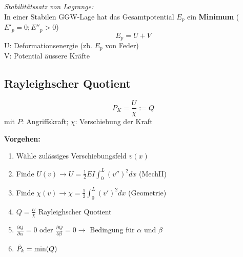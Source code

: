         \textit{Stabilitätssatz von Lagrange:}
        \\In einer Stabilen GGW-Lage hat das Gesamtpotential $E_p$ ein \textbf{Minimum} ($E'_p=0; E''_p>0$)
        \vspace{-2mm}\[E_p = U+V\]
        U: Deformationsenergie (zb. $E_p$ von Feder) 
        \\V: Potential äussere Kräfte
    \subsection{Rayleighscher Quotient}
        \[\boxed{P_K=\frac{U}{\chi}:=Q}\]
        mit $P$: Angriffskraft; \quad $\chi$: Verschiebung der Kraft
        
        \textbf{Vorgehen:}
        \begin{enumerate}
            \item Wähle zulässiges Verschiebungsfeld $v(x)$
            \item Finde $\displaystyle U(v) \rightarrow U = \frac{1}{2}EI\int_{0}^{L}(v'')^2dx$ \quad(MechII)
            \item Finde $\displaystyle \chi(v) \rightarrow \chi=\frac{1}{2}\int_{0}^{L}(v')^2dx$ \qquad(Geometrie)
            \item $Q=\frac{U}{\chi}$ Rayleighscher Quotient
            \item $\displaystyle\frac{\partial Q}{\partial\alpha}=0 \textrm{ oder } \frac{\partial Q}{\partial\beta}=0 \rightarrow$ Bedingung für $\alpha \textrm{ und } \beta$
            \item $\Tilde{P}_k=\textrm{min}(Q)$
            
        \end{enumerate}
        